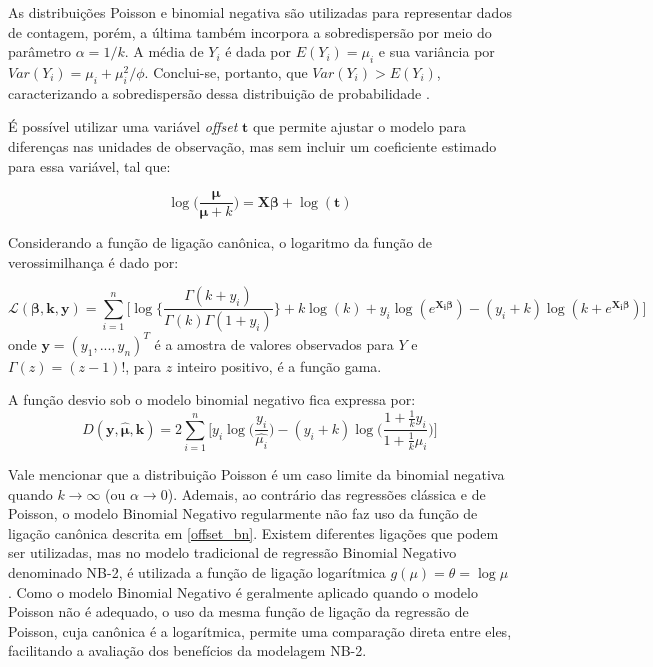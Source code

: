 \documentclass[12pt, a4paper, twoside]{report}
\numberwithin{equation}{section} %
\begin{document}
As distribuições Poisson e binomial negativa são utilizadas para representar dados de contagem, porém, a última também incorpora a sobredispersão por meio do parâmetro $\alpha=1/k$. A média de $Y_{i}$ é dada por $E(Y_{i})=\mu_{i}$ e sua variância por $Var(Y_{i})=\mu_{i} + \mu_{i}^2/\phi$. Conclui-se, portanto, que $Var(Y_{i})>E(Y_{i})$, caracterizando a sobredispersão dessa distribuição de probabilidade \citep{paula2004modelos}.

É possível utilizar uma variável \textit{offset} $\boldsymbol{t}$ que permite ajustar o modelo para diferenças nas unidades de observação, mas sem incluir um coeficiente estimado para essa variável, tal que: 

\begin{equation}\label{offset_bn}
\log{\biggl( \frac{\boldsymbol{\mu}}{\boldsymbol{\mu}+k} \biggl)}=\boldsymbol{X \beta} +\log{(\boldsymbol{t})}
\end{equation}

Considerando a função de ligação canônica, o logaritmo da função de verossimilhança é dado por: 

\begin{equation}\label{ll_bn_canonica}
\mathcal{L}(\boldsymbol{\beta},\boldsymbol{k}, \boldsymbol{y}) = \sum\limits_{i=1}^{n} \biggl[ \log \biggl\{ \frac{\Gamma(k+y_i)}{\Gamma(k)\Gamma(1+y_i)} \biggl\} +k\log(k)+y_i\log(e^{\boldsymbol{X_i\beta}})-(y_i+k)\log(k+e^{\boldsymbol{X_i\beta}}) \biggl]
\end{equation}
onde $\boldsymbol{y}=(y_1, ..., y_n)^T$ é a amostra de valores observados para $Y$ e $\Gamma(z)=(z-1)!$, para $z$ inteiro positivo, é a função gama.

A função desvio sob o modelo binomial negativo fica expressa por:
\begin{equation}\label{dev_bn}
D(\boldsymbol{y}, \boldsymbol{\hat{\mu}}, \boldsymbol{k})=2 \sum \limits_{i=1}^{n} \biggl[ y_i \log{\biggl( 
\frac{y_i}{\hat{\mu_i}} \biggl)} -(y_i+k) \log \biggl( \frac{1+\frac{1}{k}y_i}{1+\frac{1}{k}\mu_i} \biggl) \biggl]
\end{equation}

Vale mencionar que a distribuição Poisson é um caso limite da binomial negativa quando $k \xrightarrow{} \infty$ (ou $\alpha \xrightarrow{} 0$). Ademais, ao contrário das regressões clássica e de Poisson, o modelo Binomial Negativo regularmente não faz uso da função de ligação canônica descrita em \eqref{offset_bn}. Existem diferentes ligações que podem ser utilizadas, mas no modelo tradicional de regressão Binomial Negativo denominado NB-2, é utilizada a função de ligação logarítmica $g(\mu) = \theta =\log{\mu}$ \citep{hilbe2011}. Como o modelo Binomial Negativo é geralmente aplicado quando o modelo Poisson não é adequado, o uso da mesma função de ligação da regressão de Poisson, cuja canônica é a logarítmica, permite uma comparação direta entre eles, facilitando a avaliação dos benefícios da modelagem NB-2.
\end{document}
